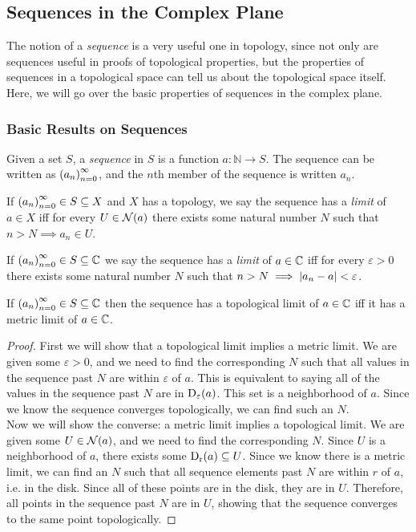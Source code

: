 \subsection{Sequences in the Complex Plane}
The notion of a \emph{sequence} is a very useful one in topology, since not only are sequences useful in proofs of topological properties, but the properties of sequences in a topological space can tell us about the topological space itself. Here, we will go over the basic properties of sequences in the complex plane.
\subsubsection{Basic Results on Sequences}
\begin{definition}[Sequence]
Given a set $S$, a \emph{sequence} in $S$ is a function $a : \mathbb{N} \longrightarrow S$. The sequence can be written as $\seq{a}$, and the $n$th member of the sequence is written $a_n$.
\end{definition}
\begin{definition}
If $\seq{a} \in S \subseteq X$ and $X$ has a topology, we say the sequence has a \emph{limit} of $a \in X$ iff for every $U \in \nbhd{a}$ there exists some natural number $N$ such that $n>N \implies a_n \in U$.
\end{definition}
\begin{definition}
If $\seq{a} \in S \subseteq \C$ we say the sequence has a \emph{limit} of $a \in \C$ iff for every $\varepsilon > 0$ there exists some natural number $N$ such that $n > N \implies \modulus{a_n-a} < \varepsilon$.
\end{definition}
\begin{theorem}
If $\seq{a} \in S \subseteq \C$ then the sequence has a topological limit of $a \in \C$ iff it has a metric limit of $a \in \C$.
\end{theorem}
\begin{proof}
First we will show that a topological limit implies a metric limit. We are given some $\varepsilon > 0$, and we need to find the corresponding $N$ such that all values in the sequence past $N$ are within $\varepsilon$ of $a$. This is equivalent to saying all of the values in the sequence past $N$ are in $\disk{a}{\varepsilon}$. This set is a neighborhood of $a$. Since we know the sequence converges topologically, we can find such an $N$.\\
Now we will show the converse: a metric limit implies a topological limit. We are given some $U \in \nbhd{a}$, and we need to find the corresponding $N$. Since $U$ is a neighborhood of $a$, there exists some $\disk{a}{r} \subseteq U$. Since we know there is a metric limit, we can find an $N$ such that all sequence elements past $N$ are within $r$ of $a$, i.e. in the disk. Since all of these points are in the disk, they are in $U$. Therefore, all points in the sequence past $N$ are in $U$, showing that the sequence converges to the same point topologically.
\end{proof}
